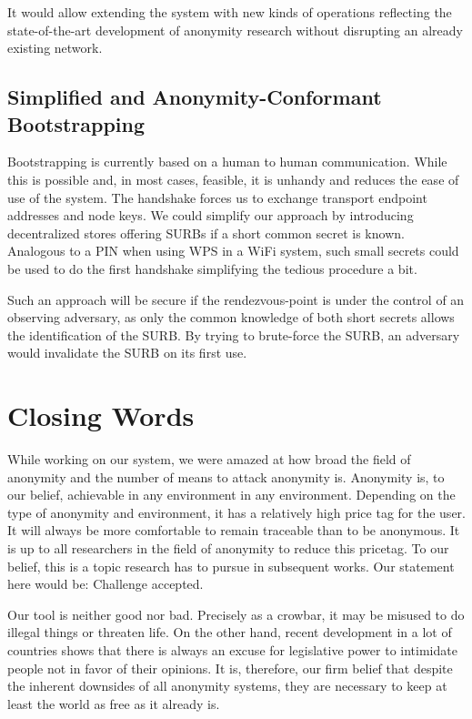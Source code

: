 It would allow extending the system with new kinds of operations reflecting the state-of-the-art development of anonymity research without disrupting an already existing network.

\section{Simplified and Anonymity-Conformant Bootstrapping}
Bootstrapping is currently based on a human to human communication. While this is possible and, in most cases, feasible, it is unhandy and reduces the ease of use of the system. The handshake forces us to exchange transport endpoint addresses and node keys. We could simplify our approach by introducing decentralized stores offering SURBs if a short common secret is known. Analogous to a PIN when using WPS in a WiFi system, such small secrets could be used to do the first handshake simplifying the tedious procedure a bit.

Such an approach will be secure if the rendezvous-point is under the control of an observing adversary, as only the common knowledge of both short secrets allows the identification of the SURB. By trying to brute-force the SURB, an adversary would invalidate the SURB on its first use.

\chapter{Closing Words}
While working on our system, we were amazed at how broad the field of anonymity and the number of means to attack anonymity is. Anonymity is, to our belief, achievable in any environment in any environment. Depending on the type of anonymity and environment, it has a relatively high price tag for the user. It will always be more comfortable to remain traceable than to be anonymous. It is up to all researchers in the field of anonymity to reduce this pricetag. To our belief, this is a topic research has to pursue in subsequent works. Our statement here would be: Challenge accepted.

Our tool is neither good nor bad. Precisely as a crowbar, it may be misused to do illegal things or threaten life. On the other hand, recent development in a lot of countries shows that there is always an excuse for legislative power to intimidate people not in favor of their opinions. It is, therefore, our firm belief that despite the inherent downsides of all anonymity systems, they are necessary to keep at least the world as free as it already is.